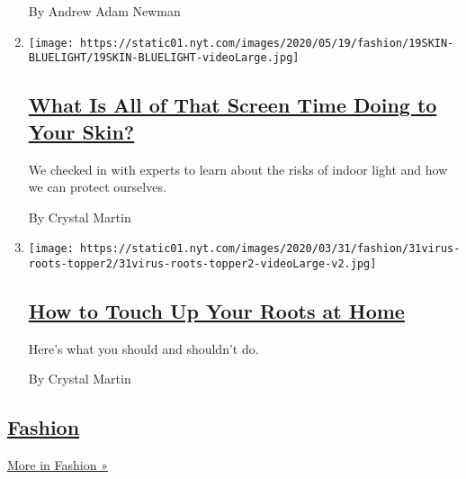 \begin{enumerate}
  By Andrew Adam Newman
\item
  \texttt{[image: https://static01.nyt.com/images/2020/05/19/fashion/19SKIN-BLUELIGHT/19SKIN-BLUELIGHT-videoLarge.jpg]}

  \hypertarget{what-is-all-of-that-screen-time-doing-to-your-skin}{%
  \subsection{\texorpdfstring{\href{/2020/05/20/style/skin-damage-blue-light-what-is-all-of-that-screen-time-doing-to-your-skin.html}{What
  Is All of That Screen Time Doing to Your
  Skin?}}{What Is All of That Screen Time Doing to Your Skin?}}\label{what-is-all-of-that-screen-time-doing-to-your-skin}}

  We checked in with experts to learn about the risks of indoor light
  and how we can protect ourselves.

  By Crystal Martin
\item
  \texttt{[image: https://static01.nyt.com/images/2020/03/31/fashion/31virus-roots-topper2/31virus-roots-topper2-videoLarge-v2.jpg]}

  \hypertarget{how-to-touch-up-your-roots-at-home}{%
  \subsection{\texorpdfstring{\href{/2020/03/31/style/how-to-touch-up-your-roots-at-home.html}{How
  to Touch Up Your Roots at
  Home}}{How to Touch Up Your Roots at Home}}\label{how-to-touch-up-your-roots-at-home}}

  Here's what you should and shouldn't do.

  By Crystal Martin
\end{enumerate}

\hypertarget{fashion}{%
\subsection{\texorpdfstring{\href{/section/fashion}{Fashion}}{Fashion}}\label{fashion}}

\href{/section/fashion}{More in Fashion »}

